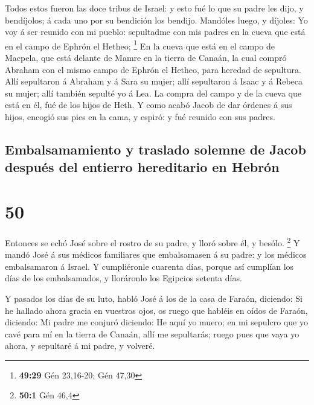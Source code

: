  Todos estos fueron las doce tribus de Israel: y esto fué
lo que su padre les dijo, y bendíjolos; á cada uno por su bendición los
bendijo.  Mandóles luego, y díjoles: Yo voy á ser reunido
con mi pueblo: sepultadme con mis padres en la cueva que está en el
campo de Ephrón el Hetheo; \footnote{\textbf{49:29} Gén 23,16-20; Gén
  47,30}  En la cueva que está en el campo de Macpela,
que está delante de Mamre en la tierra de Canaán, la cual compró Abraham
con el mismo campo de Ephrón el Hetheo, para heredad de sepultura.
 Allí sepultaron á Abraham y á Sara su mujer; allí
sepultaron á Isaac y á Rebeca su mujer; allí también sepulté yo á Lea.
 La compra del campo y de la cueva que está en él, fué de
los hijos de Heth.  Y como acabó Jacob de dar órdenes á
sus hijos, encogió sus pies en la cama, y espiró: y fué reunido con sus
padres.

\hypertarget{embalsamamiento-y-traslado-solemne-de-jacob-despuuxe9s-del-entierro-hereditario-en-hebruxf3n}{%
\subsection{Embalsamamiento y traslado solemne de Jacob después del
entierro hereditario en
Hebrón}\label{embalsamamiento-y-traslado-solemne-de-jacob-despuuxe9s-del-entierro-hereditario-en-hebruxf3n}}

\hypertarget{section-49}{%
\section{50}\label{section-49}}

 Entonces se echó José sobre el rostro de su padre, y
lloró sobre él, y besólo. \footnote{\textbf{50:1} Gén 46,4}
 Y mandó José á sus médicos familiares que embalsamasen á
su padre: y los médicos embalsamaron á Israel.  Y
cumpliéronle cuarenta días, porque así cumplían los días de los
embalsamados, y lloráronlo los Egipcios setenta días.

 Y pasados los días de su luto, habló José á los de la
casa de Faraón, diciendo: Si he hallado ahora gracia en vuestros ojos,
os ruego que habléis en oídos de Faraón, diciendo:  Mi
padre me conjuró diciendo: He aquí yo muero; en mi sepulcro que yo cavé
para mí en la tierra de Canaán, allí me sepultarás; ruego pues que vaya
yo ahora, y sepultaré á mi padre, y volveré.

